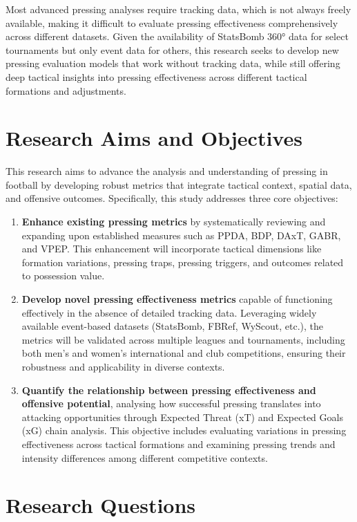 Most advanced pressing analyses require tracking data, which is not always freely available, making it difficult to evaluate pressing effectiveness comprehensively across different datasets. Given the availability of StatsBomb 360° data for select tournaments but only event data for others, this research seeks to develop new pressing evaluation models that work without tracking data, while still offering deep tactical insights into pressing effectiveness across different tactical formations and adjustments.

\section{Research Aims and Objectives}

This research aims to advance the analysis and understanding of pressing in football by developing robust metrics that integrate tactical context, spatial data, and offensive outcomes. Specifically, this study addresses three core objectives:
\begin{enumerate}
    \item \textbf{Enhance existing pressing metrics} by systematically reviewing and expanding upon established measures such as PPDA, BDP, DAxT, GABR, and VPEP. This enhancement will incorporate tactical dimensions like formation variations, pressing traps, pressing triggers, and outcomes related to possession value.
    \item \textbf{Develop novel pressing effectiveness metrics} capable of functioning effectively in the absence of detailed tracking data. Leveraging widely available event-based datasets (StatsBomb, FBRef, WyScout, etc.), the metrics will be validated across multiple leagues and tournaments, including both men's and women's international and club competitions, ensuring their robustness and applicability in diverse contexts.
    \item \textbf{Quantify the relationship between pressing effectiveness and offensive potential}, analysing how successful pressing translates into attacking opportunities through Expected Threat (xT) and Expected Goals (xG) chain analysis. This objective includes evaluating variations in pressing effectiveness across tactical formations and examining pressing trends and intensity differences among different competitive contexts.
\end{enumerate}

\section{Research Questions}

